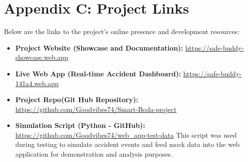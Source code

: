 \documentclass[12pt]{article}
\begin{document}
\section*{Appendix C: Project Links}

Below are the links to the project’s online presence and development resources:

\begin{itemize}
  \item \textbf{Project Website (Showcase and Documentation):} \href{https://safe-buddy-showcase.web.app}{https://safe-buddy-showcase.web.app}
  \item \textbf{Live Web App (Real-time Accident Dashboard):} \href{https://safe-buddy-141a4.web.app}{https://safe-buddy-141a4.web.app}
  \item \textbf{Project Repo(Git Hub Repository):} \href{https://github.com/Goodvibes74/Smart-Boda-project}{https://github.com/Goodvibes74/Smart-Boda-project}
  \item \textbf{Simulation Script (Python - GitHub):} \href{https://github.com/Goodvibes74/web_app-test-data}{https://github.com/Goodvibes74/web_app-test-data}  
  This script was used during testing to simulate accident events and feed mock data into the web application for demonstration and analysis purposes.
\end{itemize}
\end{document}
